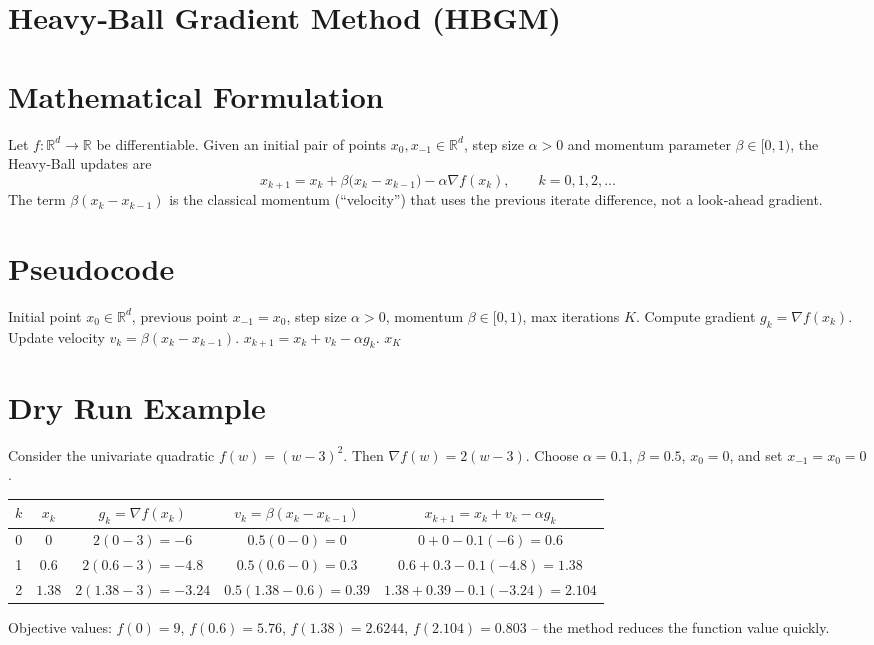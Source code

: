 \documentclass{article}
\newcommand{\R}{\mathbb{R}}
\begin{document}
\section*{Heavy‑Ball Gradient Method (HBGM)}

\section*{Mathematical Formulation}
Let $f:\R^{d}\rightarrow\R$ be differentiable.  
Given an initial pair of points $x_{0},x_{-1}\in\R^{d}$, step size $\alpha>0$ and momentum parameter $\beta\in[0,1)$, the Heavy‑Ball updates are
\[
\boxed{
x_{k+1}=x_{k}+ \beta\bigl(x_{k}-x_{k-1}\bigr)-\alpha\nabla f(x_{k}),\qquad k=0,1,2,\dots
}
\tag{HB}
\]
The term $\beta(x_{k}-x_{k-1})$ is the classical momentum (``velocity'') that uses the previous iterate difference, not a look‑ahead gradient.

\section*{Pseudocode}
\begin{algorithm}[H]
\caption{Heavy‑Ball Gradient Method}
\begin{algorithmic}[1]
\REQUIRE Initial point $x_{0}\in\R^{d}$, previous point $x_{-1}=x_{0}$, step size $\alpha>0$, momentum $\beta\in[0,1)$, max iterations $K$.
    \STATE Compute gradient $g_{k}= \nabla f(x_{k})$.
    \STATE Update velocity $v_{k}= \beta (x_{k}-x_{k-1})$.
    \STATE $x_{k+1}= x_{k}+v_{k}-\alpha g_{k}$.
\ENDFOR
\RETURN $x_{K}$
\end{algorithmic}
\end{algorithm}

\section*{Dry Run Example}
Consider the univariate quadratic $f(w)=(w-3)^{2}$.  
Then $\nabla f(w)=2(w-3)$.  Choose $\alpha=0.1$, $\beta=0.5$, $x_{0}=0$, and set $x_{-1}=x_{0}=0$.

\begin{center}
\begin{tabular}{c|c|c|c|c}
$k$ & $x_{k}$ & $g_{k}= \nabla f(x_{k})$ & $v_{k}= \beta(x_{k}-x_{k-1})$ & $x_{k+1}=x_{k}+v_{k}-\alpha g_{k}$\\\hline
0 & $0$ & $2(0-3)=-6$ & $0.5(0-0)=0$ & $0+0-0.1(-6)=0.6$\\
1 & $0.6$ & $2(0.6-3)=-4.8$ & $0.5(0.6-0)=0.3$ & $0.6+0.3-0.1(-4.8)=1.38$\\
2 & $1.38$ & $2(1.38-3)=-3.24$ & $0.5(1.38-0.6)=0.39$ & $1.38+0.39-0.1(-3.24)=2.104$\\
\end{tabular}
\end{center}
Objective values: $f(0)=9$, $f(0.6)=5.76$, $f(1.38)=2.6244$, $f(2.104)=0.803$ – the method reduces the function value quickly.
\end{document}
